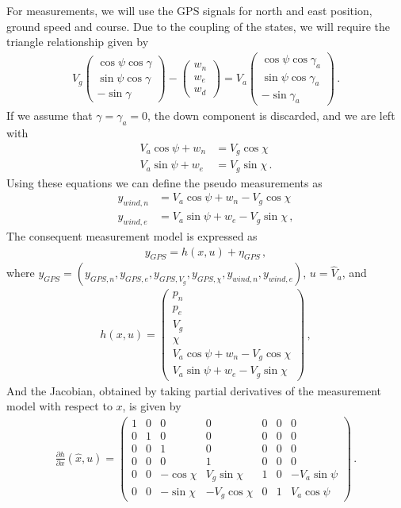 For measurements, we will use the GPS signals for north and east position, ground speed and course. Due to the coupling of the states, we will require the triangle relationship given by
\begin{align*}
V_g \begin{pmatrix}
\cos\psi\cos\gamma \\
\sin\psi\cos\gamma \\
-\sin\gamma
\end{pmatrix}
-
\begin{pmatrix}
w_n \\
w_e \\
w_d
\end{pmatrix}
=V_a
\begin{pmatrix}
\cos\psi\cos\gamma_a \\
\sin\psi\cos\gamma_a \\
-\sin\gamma_a
\end{pmatrix}\,.
\end{align*} 
If we assume that $\gamma=\gamma_a=0$, the down component is discarded, and we are left with
\begin{align*}
V_a\cos\psi+w_n&=V_g\cos\chi \\
V_a\sin\psi+w_e&=V_g\sin\chi\,.
\end{align*}
Using these equations we can define the pseudo measurements as
\begin{align*}
y_{wind,n} &= V_a\cos\psi+w_n-V_g\cos\chi \\
y_{wind,e} &= V_a\sin\psi+w_e-V_g\sin\chi\,,
\end{align*}
The consequent measurement model is expressed as
\begin{align*}
y_{GPS}=h(x,u)+\eta_{GPS}\,,
\end{align*}
where $y_{GPS}=(y_{GPS,n},y_{GPS,e},y_{GPS,V_g},y_{GPS,\chi},y_{wind,n},y_{wind,e})$, $u=\hat{V}_a$, and
\begin{align}
h(x,u)=
\begin{pmatrix}
p_n \\
p_e \\
V_g \\
\chi \\
V_a\cos\psi+w_n-V_g\cos\chi \\
V_a\sin\psi+w_e-V_g\sin\chi
\end{pmatrix}\,,
\end{align}
And the Jacobian, obtained by taking partial derivatives of the measurement model with respect to $x$, is given by
\begin{align}
\frac{\partial h}{\partial x}(\hat{x},u)=
\begin{pmatrix}
1 & 0 & 0 & 0 & 0 & 0 & 0 \\
0 & 1 & 0 & 0 & 0 & 0 & 0 \\
0 & 0 & 1 & 0 & 0 & 0 & 0 \\
0 & 0 & 0 & 1 & 0 & 0 & 0 \\
0 & 0 & -\cos\chi & V_g\sin\chi & 1 & 0 & -V_a\sin\psi \\
0 & 0 & -\sin\chi & -V_g\cos\chi & 0 & 1 & V_a\cos\psi
\end{pmatrix}\,.
\end{align}
